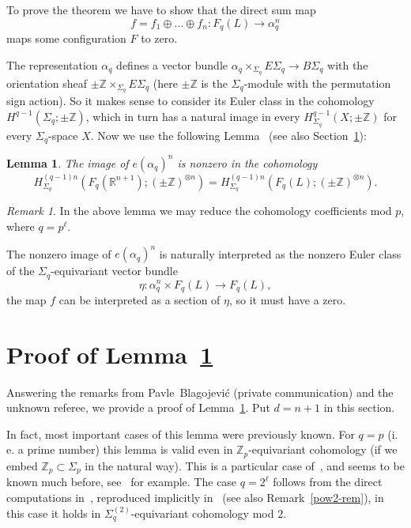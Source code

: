 \documentclass[12pt,a4paper,oneside]{amsart}
\newtheorem{lem}[thm]{Lemma}
\theoremstyle{definition}
\theoremstyle{remark}
\newtheorem{rem}[thm]{Remark}
\numberwithin{equation}{section}
\newcommand{\Sg}{\Sigma}
\begin{document}
To prove the theorem we have to show that the direct sum map 
$$
f=f_1\oplus\dots\oplus f_n : F_q(L) \to \alpha_q^n
$$
maps some configuration $F$ to zero. 

The representation $\alpha_q$ defines a vector bundle $\alpha_q\times_{\Sg_q} E\Sg_q\to B\Sg_q$ with the orientation sheaf $\pm\mathbb Z\times_{\Sg_q} E\Sg_q$ (here $\pm \mathbb Z$ is the $\Sg_q$-module with the permutation sign action). So it makes sense to consider its Euler class in the cohomology $H^{q-1}(\Sg_q; \pm\mathbb Z)$, which in turn has a natural image in every $H_{\Sg_q}^{q-1}(X; \pm\mathbb Z)$ for every $\Sg_q$-space $X$. Now we use the following Lemma~\cite[Lemma~6]{kar2009} (see also Section~\ref{eu-nz-sec}):

\begin{lem}
\label{eu-nz}
The image of $e(\alpha_q)^n$ is nonzero in the cohomology
$$
H_{\Sg_q}^{(q-1)n}(F_q(\mathbb R^{n+1}); (\pm\mathbb Z)^{\otimes n}) = H_{\Sg_q}^{(q-1)n}(F_q(L); (\pm\mathbb Z)^{\otimes n}).
$$
\end{lem}

\begin{rem}
In the above lemma we may reduce the cohomology coefficients mod $p$, where $q=p^\ell$.
\end{rem}

The nonzero image of $e(\alpha_q)^n$ is naturally interpreted as the nonzero Euler class of the $\Sg_q$-equivariant vector bundle 
$$
\eta : \alpha_q^n\times F_q(L) \to F_q(L),
$$ 
the map $f$ can be interpreted as a section of $\eta$, so it must have a zero.

\section{Proof of Lemma~\ref{eu-nz}}
\label{eu-nz-sec}

Answering the remarks from Pavle~Blagojevi\'c (private communication) and the unknown referee, we provide a proof of Lemma~\ref{eu-nz}. Put $d=n+1$ in this section.

In fact, most important cases of this lemma were previously known. For $q=p$ (i. e. a prime number) this lemma is valid even in $\mathbb Z_p$-equivariant cohomology (if we embed $\mathbb Z_p\subset \Sg_p$ in the natural way). This is a particular case of~\cite[Lemma~5]{kar2009}, and seems to be known much before, see~\cite[Theorem~3.4, Corollaries~3.5 and 3.6]{ct1991} for example. The case $q=2^\ell$ follows from the direct computations in~\cite{hung1990}, reproduced implicitly in~\cite{mem2009} (see also Remark~\ref{pow2-rem}), in this case it holds in $\Sigma_q^{(2)}$-equivariant cohomology mod $2$.
\end{document}
